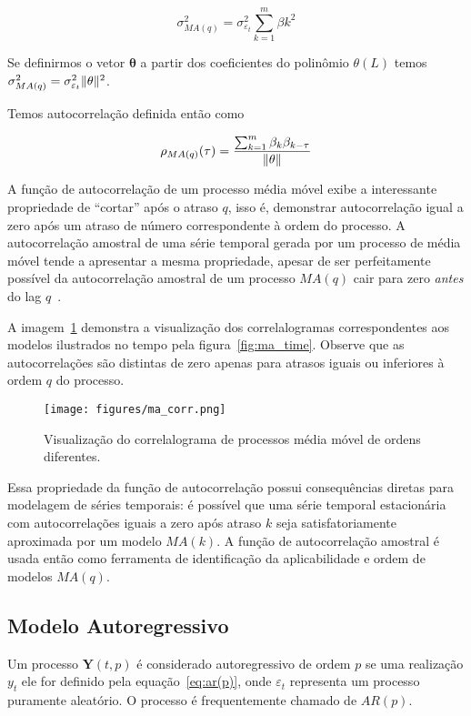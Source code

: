 $$\sigma^{2}_{MA(q)} = \sigma_{\varepsilon_t}^2 \sum^{m}_{k=1} \beta{k}^2 $$

Se definirmos o vetor $\mathbf{\theta}$ a partir dos coeficientes do polinômio
$\theta(L)$ temos $\sigma^{2}_{MA(q)} = \sigma_{\varepsilon_t}^2\lVert\mathbf{\theta}\rVert^2$.

Temos autocorrelação definida então como

$$\rho_{MA(q)}(\tau) = \frac{\sum^{m}_{k=1} \beta_k\beta_{k-\tau}}{\lVert\mathbf{\theta}\rVert}$$

A função de autocorrelação de um processo média móvel exibe a interessante
propriedade de ``cortar'' após o atraso $q$, isso é, demonstrar autocorrelação
igual a zero após um atraso de número correspondente à ordem do processo. A
autocorrelação amostral de uma série temporal gerada por um processo de média
móvel tende a apresentar a mesma propriedade, apesar de ser perfeitamente
possível da autocorrelação amostral de um processo $MA(q)$ cair para zero
\emph{antes} do lag $q$~\cite{chatfield}.

A imagem~\ref{fig:ma_corr} demonstra a visualização dos correlalogramas
correspondentes aos modelos ilustrados no tempo pela figura~\ref{fig:ma_time}.
Observe que as autocorrelações são distintas de zero apenas para atrasos
iguais ou inferiores à ordem $q$ do processo.

\begin{figure}[H]
    \centering
    \texttt{[image: figures/ma\_corr.png]}
    \caption{Visualização do correlalograma de processos média móvel de ordens
    diferentes.}
    \label{fig:ma_corr}
\end{figure}

Essa propriedade da função de autocorrelação possui consequências diretas para
modelagem de séries temporais: é possível que uma série temporal estacionária
com autocorrelações iguais a zero após atraso $k$ seja satisfatoriamente
aproximada por um modelo $MA(k)$. A função de autocorrelação amostral é usada
então como ferramenta de identificação da aplicabilidade e ordem de modelos
$MA(q)$.

\subsection{Modelo Autoregressivo}
\label{ssec:AR(p)}

Um processo ${\mathbf{Y}(t, p)}$ é considerado autoregressivo de ordem $p$ se
uma realização $y_t$ ele for definido pela equação~\ref{eq:ar(p)}, onde
$\varepsilon_t$ representa um processo puramente aleatório. O processo é
frequentemente chamado de $AR(p)$.

